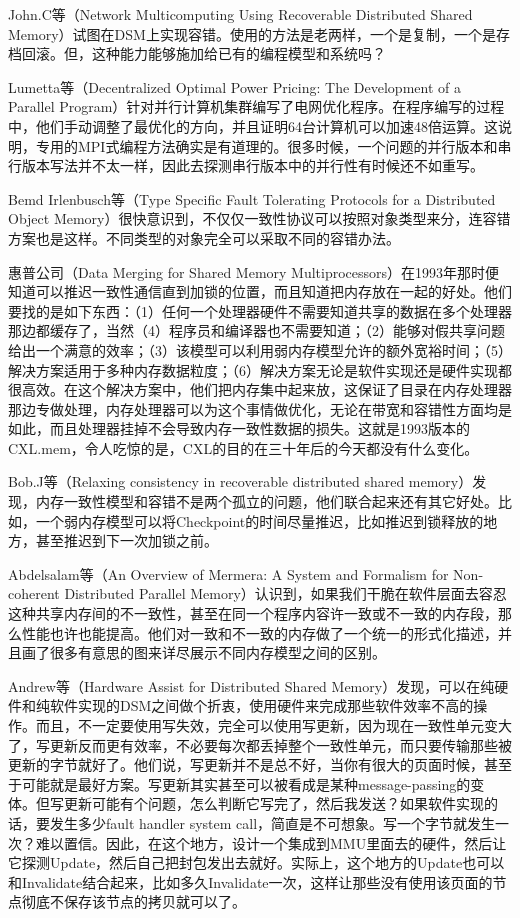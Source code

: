 \documentclass[a4paper,twoside]{scrbook}
\begin{document}
John.C等（Network Multicomputing Using Recoverable Distributed Shared Memory）试图在DSM上实现容错。使用的方法是老两样，一个是复制，一个是存档回滚。但，这种能力能够施加给已有的编程模型和系统吗？

Lumetta等（Decentralized Optimal Power Pricing: The Development of a Parallel Program）针对并行计算机集群编写了电网优化程序。在程序编写的过程中，他们手动调整了最优化的方向，并且证明64台计算机可以加速48倍运算。这说明，专用的MPI式编程方法确实是有道理的。很多时候，一个问题的并行版本和串行版本写法并不太一样，因此去探测串行版本中的并行性有时候还不如重写。

Bemd Irlenbusch等（Type Specific Fault Tolerating Protocols for a Distributed Object Memory）很快意识到，不仅仅一致性协议可以按照对象类型来分，连容错方案也是这样。不同类型的对象完全可以采取不同的容错办法。

惠普公司（Data Merging for Shared Memory Multiprocessors）在1993年那时便知道可以推迟一致性通信直到加锁的位置，而且知道把内存放在一起的好处。他们要找的是如下东西：（1）任何一个处理器硬件不需要知道共享的数据在多个处理器那边都缓存了，当然（4）程序员和编译器也不需要知道；（2）能够对假共享问题给出一个满意的效率；（3）该模型可以利用弱内存模型允许的额外宽裕时间；（5）解决方案适用于多种内存数据粒度；（6）解决方案无论是软件实现还是硬件实现都很高效。在这个解决方案中，他们把内存集中起来放，这保证了目录在内存处理器那边专做处理，内存处理器可以为这个事情做优化，无论在带宽和容错性方面均是如此，而且处理器挂掉不会导致内存一致性数据的损失。这就是1993版本的CXL.mem，令人吃惊的是，CXL的目的在三十年后的今天都没有什么变化。

Bob.J等（Relaxing consistency in recoverable distributed shared memory）发现，内存一致性模型和容错不是两个孤立的问题，他们联合起来还有其它好处。比如，一个弱内存模型可以将Checkpoint的时间尽量推迟，比如推迟到锁释放的地方，甚至推迟到下一次加锁之前。

Abdelsalam等（An Overview of Mermera: A System and Formalism for Non-coherent Distributed Parallel Memory）认识到，如果我们干脆在软件层面去容忍这种共享内存间的不一致性，甚至在同一个程序内容许一致或不一致的内存段，那么性能也许也能提高。他们对一致和不一致的内存做了一个统一的形式化描述，并且画了很多有意思的图来详尽展示不同内存模型之间的区别。

Andrew等（Hardware Assist for Distributed Shared Memory）发现，可以在纯硬件和纯软件实现的DSM之间做个折衷，使用硬件来完成那些软件效率不高的操作。而且，不一定要使用写失效，完全可以使用写更新，因为现在一致性单元变大了，写更新反而更有效率，不必要每次都丢掉整个一致性单元，而只要传输那些被更新的字节就好了。他们说，写更新并不是总不好，当你有很大的页面时候，甚至于可能就是最好方案。写更新其实甚至可以被看成是某种message-passing的变体。但写更新可能有个问题，怎么判断它写完了，然后我发送？如果软件实现的话，要发生多少fault handler system call，简直是不可想象。写一个字节就发生一次？难以置信。因此，在这个地方，设计一个集成到MMU里面去的硬件，然后让它探测Update，然后自己把封包发出去就好。实际上，这个地方的Update也可以和Invalidate结合起来，比如多久Invalidate一次，这样让那些没有使用该页面的节点彻底不保存该节点的拷贝就可以了。
\end{document}
